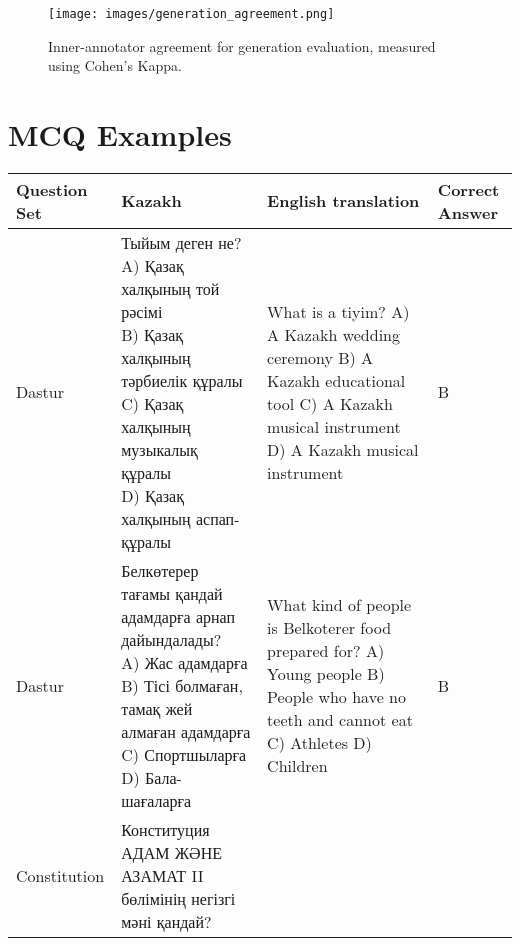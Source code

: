 \begin{figure}[h!]
    \centering
    \texttt{[image: images/generation\_agreement.png]} %
    \caption{Inner-annotator agreement for generation evaluation, measured using Cohen’s Kappa.}

    \label{fig:inner-annotator-generation}
\end{figure}


\clearpage
%


\section{MCQ Examples}
\label{sec:mcq_samples}
\begin{table*}[ht]
\centering
\renewcommand{\arraystretch}{1.5} %
\scriptsize %
\begin{tabular}{|p{2cm}|p{5cm}|p{5cm}|p{1cm}|}  %
\hline
\textbf{Question Set}&\textbf{Kazakh} & \textbf{English translation} & \textbf{Correct Answer}\\ \hline
Dastur & \foreignlanguage{russian}{Тыйым деген не? \newline
A) Қазақ халқының той рәсімі \newline
B) Қазақ халқының тәрбиелік құралы \newline
C) Қазақ халқының музыкалық құралы \newline
D) Қазақ халқының аспап-құралы\newline
} & 
What is a tiyim? \newline
A) A Kazakh wedding ceremony \newline
B) A Kazakh educational tool \newline
C) A Kazakh musical instrument \newline
D) A Kazakh musical instrument\newline
& B \\
\hline
Dastur & \foreignlanguage{russian}{
Белкөтерер тағамы қандай адамдарға арнап дайындалады? \newline
A) Жас адамдарға \newline
B) Тісі болмаған, тамақ жей алмаған адамдарға \newline 
C) Спортшыларға
 \newline
D) Бала-шағаларға \newline
} & 
What kind of people is Belkoterer food prepared for? \newline
A) Young people \newline
B) People who have no teeth and cannot eat \newline 
C) Athletes
\newline
D) Children \newline
&
B \\
\hline
Constitution &
\foreignlanguage{russian}{
Конституция АДАМ ЖӘНЕ АЗАМАТ II бөлімінің  негізгі мәні қандай? \newline

}
\end{tabular}
\end{table*}
